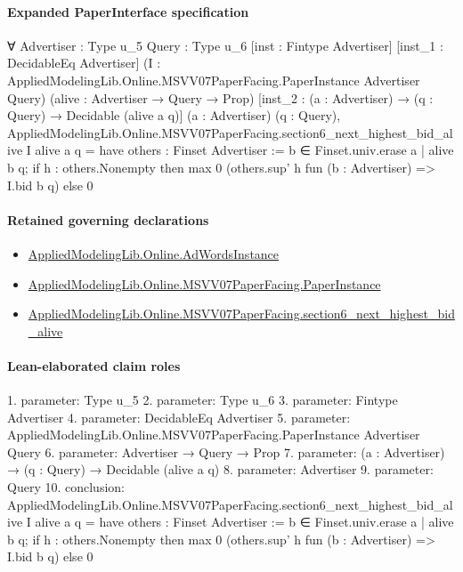 \documentclass[10pt]{article}
\begin{document}
\paragraph{Expanded PaperInterface specification}
\begin{ReviewVerbatim}
∀ {Advertiser : Type u_5} {Query : Type u_6} [inst : Fintype Advertiser] [inst_1 : DecidableEq Advertiser]
  (I : AppliedModelingLib.Online.MSVV07PaperFacing.PaperInstance Advertiser Query) (alive : Advertiser → Query → Prop)
  [inst_2 : (a : Advertiser) → (q : Query) → Decidable (alive a q)] (a : Advertiser) (q : Query),
  AppliedModelingLib.Online.MSVV07PaperFacing.section6_next_highest_bid_alive I alive a q =
    have others : Finset Advertiser := {b ∈ Finset.univ.erase a | alive b q};
    if h : others.Nonempty then max 0 (others.sup' h fun (b : Advertiser) => I.bid b q) else 0
\end{ReviewVerbatim}

\paragraph{Retained governing declarations}
\begin{itemize}\raggedright
\item \hyperlink{governing-declaration-e5ce49672bf26ab1}{Applied\allowbreak{}Modeling\allowbreak{}Lib.\allowbreak{}Online.\allowbreak{}Ad\allowbreak{}Words\allowbreak{}Instance}
\item \hyperlink{governing-declaration-11907576ec71eeb5}{Applied\allowbreak{}Modeling\allowbreak{}Lib.\allowbreak{}Online.\allowbreak{}MSVV07\allowbreak{}Paper\allowbreak{}Facing.\allowbreak{}Paper\allowbreak{}Instance}
\item \hyperlink{governing-declaration-8d39d8403b5ede1b}{Applied\allowbreak{}Modeling\allowbreak{}Lib.\allowbreak{}Online.\allowbreak{}MSVV07\allowbreak{}Paper\allowbreak{}Facing.\allowbreak{}section6\_\allowbreak{}next\_\allowbreak{}highest\_\allowbreak{}bid\_\allowbreak{}alive}
\end{itemize}
\paragraph{Lean-elaborated claim roles}\begin{ReviewVerbatim}
1. parameter: Type u_5
2. parameter: Type u_6
3. parameter: Fintype Advertiser
4. parameter: DecidableEq Advertiser
5. parameter: AppliedModelingLib.Online.MSVV07PaperFacing.PaperInstance Advertiser Query
6. parameter: Advertiser → Query → Prop
7. parameter: (a : Advertiser) → (q : Query) → Decidable (alive a q)
8. parameter: Advertiser
9. parameter: Query
10. conclusion: AppliedModelingLib.Online.MSVV07PaperFacing.section6_next_highest_bid_alive I alive a q =
  have others : Finset Advertiser := {b ∈ Finset.univ.erase a | alive b q};
  if h : others.Nonempty then max 0 (others.sup' h fun (b : Advertiser) => I.bid b q) else 0
\end{ReviewVerbatim}
\end{document}
